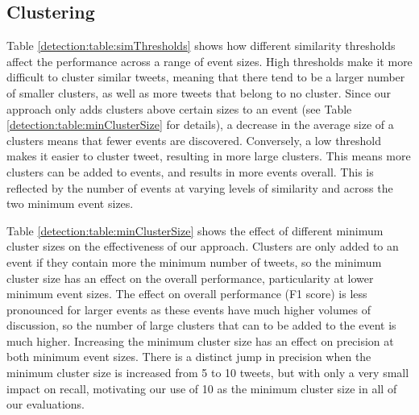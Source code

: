 \subsection{Clustering}
\label{detection:sec:simThresholds}
Table \ref{detection:table:simThresholds} shows how different similarity thresholds affect the performance across a range of event sizes.
High thresholds make it more difficult to cluster similar tweets, meaning that there tend to be a larger number of smaller clusters, as well as more tweets that belong to no cluster.
Since our approach only adds clusters above certain sizes to an event (see Table \ref{detection:table:minClusterSize} for details), a decrease in the average size of a clusters means that fewer events are discovered.
Conversely, a low threshold makes it easier to cluster tweet, resulting in more large clusters.
This means more clusters can be added to events, and results in more events overall.
This is reflected by the number of events at varying levels of similarity and across the two minimum event sizes.

Table \ref{detection:table:minClusterSize} shows the effect of different minimum cluster sizes on the effectiveness of our approach.
Clusters are only added to an event if they contain more the minimum number of tweets, so the minimum cluster size has an effect on the overall performance, particularity at lower minimum event sizes.
The effect on overall performance (F1 score) is less pronounced for larger events as these events have much higher volumes of discussion, so the number of large clusters that can to be added to the event is much higher.
Increasing the minimum cluster size has an effect on precision at both minimum event sizes.
There is a distinct jump in precision when the minimum cluster size is increased from 5 to 10 tweets, but with only a very small impact on recall, motivating our use of 10 as the minimum cluster size in all of our evaluations.

